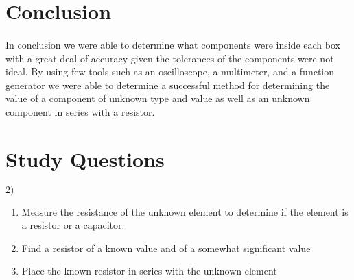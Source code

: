 \documentclass{article}
\begin{document}

\section*{Conclusion}
\paragraph{}
In conclusion we were able to determine what components were inside each box with
a great deal of accuracy given the tolerances of the components were not ideal. By
using few tools such as an oscilloscope, a multimeter, and a function generator we
were able to determine a successful method for determining the value of a component
of unknown type and value as well as an unknown component in series with a resistor.

\section*{Study Questions}

$2)$
\begin{enumerate}
\item Measure the resistance of the unknown element to determine if the element is
a resistor or a capacitor.
\item Find a resistor of a known value and of a somewhat significant value
\item Place the known resistor in series with the unknown element

\end{enumerate}


\end{document}
